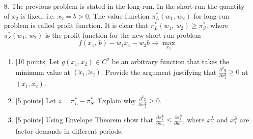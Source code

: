 \documentclass[12pt,a4paper]{article}
\begin{document}
\newpage
{}

8. The previous problem is stated in the long-run. In the short-run the quantity of ${x_2}$ is fixed, i.e. ${x_2} = b > 0$. The value function $\pi _L^*({w_1},\,{w_2})$ for long-run problem is called profit function. It is clear that $\pi_L^*({w_1},\,{w_2}) \geqslant \pi _S^*$, where $\pi_S^*({w_1},\,{w_2})$  is the profit function for the new short-run problem
\[
f({x_1},\,b) - {w_1}{x_1} - {w_2}b \to \max_{x_1}
\]
\begin{enumerate}
  \item {[10 points]} Let $g({x_1}, {x_2}) \in {C^2}$ be an arbitrary function that takes the minimum value at $({\tilde x_1}, {\tilde x_2})$. Provide the argument justifying that $\frac{{{\partial ^2}g}}{{\partial x_1^2}} \geqslant 0$ at $({\tilde x_1}, {\tilde x_2})$.
  \item {[5 points]} Let $z = \pi _L^* - \pi _S^*$. Explain why $\frac{{{\partial ^2}z}}{{\partial w_1^2}} \geqslant 0$.
  \item {[5 points]} Using Envelope Theorem show that $\frac{{\partial x_1^L}}{{\partial {w_1}}} \leqslant \frac{{\partial x_1^S}}{{\partial {w_1}}}$, where $x_1^L$ and $x_1^S$ are factor demands in different periods.
\end{enumerate}
\end{document}
